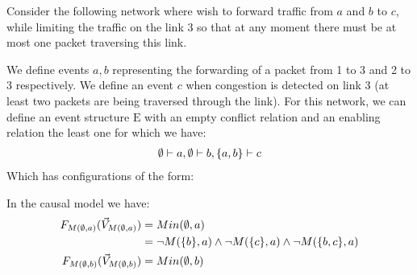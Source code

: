 \begin{example}
    Consider the following network where wish to forward traffic from $a$ and $b$ to $c$, while limiting the traffic on the link 3 so that
    at any moment there must be at most one packet traversing this link.
    \begin{center}
    \end{center}
    We define events $a,b$ representing the forwarding of a packet from
    1 to 3 and 2 to 3 respectively.
    We define an event $c$ when congestion is detected on link 3 (at least two packets are being traversed through the link).
    For this network, we can define an event structure $\mathrm{E}$
    with an empty conflict relation and an enabling relation the least
    one for which we have:
    \begin{align*}
        \emptyset \vdash a, \emptyset \vdash b, \{a,b\} \vdash c
    \end{align*}
    Which has configurations of the form:
    \begin{center}
    \end{center}
    In the causal model we have:
    \begin{align*}
        \f{M(\e,a)}       & = Min(\e,a)                              \\
                          & = \neg M(\s{b},a) \wedge \neg M(\s{c},a)
        \wedge \neg M(\s{b,c},a)                                     \\
        \f{M(\e,b)}       & = Min(\e,b)                              \\

\end{align*}
\end{example}
